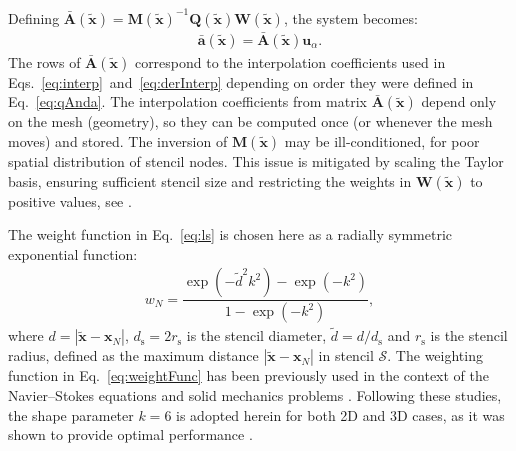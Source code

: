 \documentclass[sn-mathphys,Numbered]{sn-jnl}%
\newcommand{\bb}{\boldsymbol}
\begin{document}
Defining $\bar{\mathbf{A}}(\tilde{\bb{x}})=\mathbf{M}(\tilde{\bb{x}})^{-1}\mathbf{Q}(\tilde{\bb{x}})\mathbf{W}(\tilde{\bb{x}})$, the system becomes:
%
\begin{eqnarray}\label{eq:lsA}
\mathbf{\bar{a}}(\tilde{\bb{x}}) = \mathbf{\bar{A}}(\tilde{\bb{x}})\mathbf{u}_\alpha.
\end{eqnarray}
%
The rows of $\bar{\mathbf{A}}(\tilde{\boldsymbol{x}})$ correspond to the interpolation coefficients used in
Eqs.~\eqref{eq:interp}~and~\eqref{eq:derInterp} depending on order they were defined in Eq.~\eqref{eq:qAnda}.
The interpolation coefficients from matrix $\bar{\mathbf{A}}(\tilde{\boldsymbol{x}})$ depend only on the mesh (geometry), so they can be computed once (or whenever the mesh moves) and stored.
The inversion of ${\mathbf{M}}(\tilde{\boldsymbol{x}})$ may be ill-conditioned, for poor spatial distribution of stencil nodes.
This issue is mitigated by scaling the Taylor basis, ensuring sufficient stencil size and restricting the weights in $\mathbf{W}(\tilde{\boldsymbol{x}})$ to positive values, see \cite{Castrillo2022, Castrillo2023}.
%

%
The weight function in Eq.~\eqref{eq:ls} is chosen here as a radially symmetric exponential function:
\begin{eqnarray}\label{eq:weightFunc}
w_N = \dfrac{\exp\left( -\tilde{d}^2k^2\right) -\exp\left(-k^2\right)}{1-\exp\left(-k^2\right)},
\end{eqnarray}
where $d=|\bb{\tilde{x}}-\bb{x}_N|$, $d_{\mathrm{s}}=2r_{\mathrm{s}}$ is the stencil diameter, $\tilde{d}=d/d_{\mathrm{s}}$ and $r_{\mathrm{s}}$ is the stencil radius, defined as the maximum distance $|\bb{\tilde{x}}-\bb{x}_N|$ in stencil $\mathcal{S}$. The weighting function in Eq.~\eqref{eq:weightFunc} has been previously used in the context of the Navier–Stokes equations
\cite{Khelladi2011, Ramirez2014} and solid mechanics problems \cite{Castrillo2022, Castrillo2023, Castrillo2024}.
Following these studies, the shape parameter $k = 6$ is adopted herein for both 2D and 3D cases, as it was shown to provide optimal performance \cite{Castrillo2022, Castrillo2023, Castrillo2024}.
%
\end{document}

